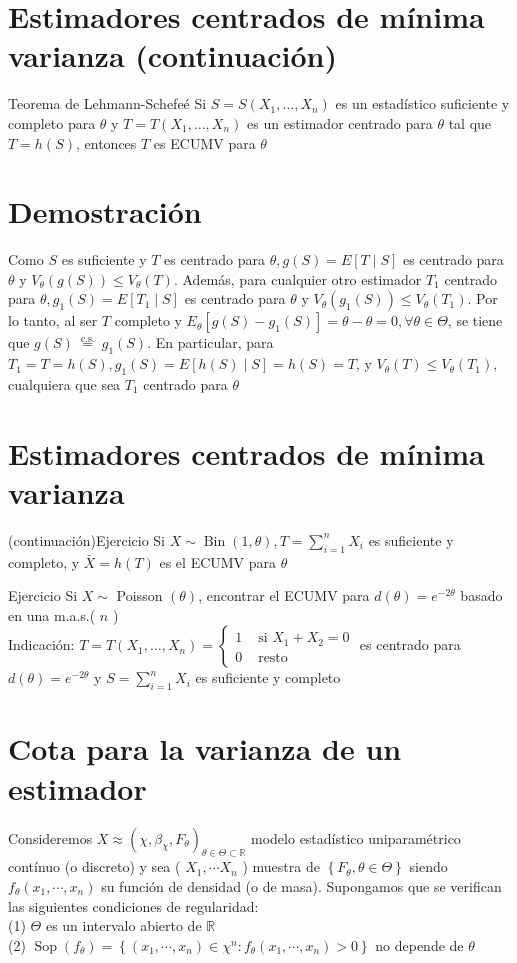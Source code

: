 \section*{Estimadores centrados de mínima varianza (continuación)}
Teorema de Lehmann-Schefeé Si $S=S\left(X_{1}, \ldots, X_{n}\right)$ es un estadístico suficiente y completo para $\theta$ y $T=T\left(X_{1}, \ldots, X_{n}\right)$ es un estimador centrado para $\theta$ tal que $T=h(S)$, entonces $T$ es ECUMV para $\theta$

\section*{Demostración}
Como $S$ es suficiente y $T$ es centrado para $\theta, g(S)=E[T \mid S]$ es centrado para $\theta$ y $V_{\theta}(g(S)) \leq V_{\theta}(T)$. Además, para cualquier otro estimador $T_{1}$ centrado para $\theta, g_{1}(S)=E\left[T_{1} \mid S\right]$ es centrado para $\theta$ y $V_{\theta}\left(g_{1}(S)\right) \leq V_{\theta}\left(T_{1}\right)$. Por lo tanto, al ser $T$ completo y $E_{\theta}\left[g(S)-g_{1}(S)\right]=\theta-\theta=0, \forall \theta \in \Theta$, se tiene que $g(S) \stackrel{\text { c.s. }}{=} g_{1}(S)$. En particular, para $T_{1}=T=h(S), g_{1}(S)=E[h(S) \mid S]=h(S)=T$, y $V_{\theta}(T) \leq V_{\theta}\left(T_{1}\right)$, cualquiera que sea $T_{1}$ centrado para $\theta$

\section*{Estimadores centrados de mínima varianza}
 (continuación)Ejercicio Si $X \sim \operatorname{Bin}(1, \theta), T=\sum_{i=1}^{n} X_{i}$ es suficiente y completo, y $\bar{X}=h(T)$ es el ECUMV para $\theta$

Ejercicio Si $X \sim$ Poisson $(\theta)$, encontrar el ECUMV para $d(\theta)=e^{-2 \theta}$ basado en una m.a.s.( $n$ )\\
Indicación: $T=T\left(X_{1}, \ldots, X_{n}\right)=\left\{\begin{array}{ll}1 & \text { si } X_{1}+X_{2}=0 \\ 0 & \text { resto }\end{array}\right.$ es centrado para $d(\theta)=e^{-2 \theta}$ y $S=\sum_{i=1}^{n} X_{i}$ es suficiente y completo

\section*{Cota para la varianza de un estimador}
Consideremos $X \approx\left(\chi, \beta_{\chi}, F_{\theta}\right)_{\theta \in \Theta \subset \mathbb{R}}$ modelo estadístico uniparamétrico contínuo (o discreto) y sea ( $X_{1}, \cdots X_{n}$ ) muestra de $\left\{F_{\theta}, \theta \in \Theta\right\}$ siendo $f_{\theta}\left(x_{1}, \cdots, x_{n}\right)$ su función de densidad (o de masa). Supongamos que se verifican las siguientes condiciones de regularidad:\\
(1) $\Theta$ es un intervalo abierto de $\mathbb{R}$\\
(2) $\operatorname{Sop}\left(f_{\theta}\right)=\left\{\left(x_{1}, \cdots, x_{n}\right) \in \chi^{n}: f_{\theta}\left(x_{1}, \cdots, x_{n}\right)>0\right\}$ no depende de $\theta$

